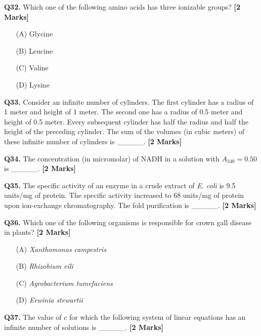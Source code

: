 \documentclass[11pt]{article}
\newcommand{\questionb}[2]{
    \noindent\textbf{Q#2.} #1 \hfill \textbf{[2 Marks]}
}
\begin{document}
\vspace{0.5cm}

\questionb{Which one of the following amino acids has three ionizable groups?}{32}
\begin{enumerate}
    \item[(A)] Glycine
    \item[(B)] Leucine  
    \item[(C)] Valine
    \item[(D)] Lysine
\end{enumerate}

\vspace{0.5cm}

\questionb{Consider an infinite number of cylinders. The first cylinder has a radius of 1 meter and height of 1 meter. The second one has a radius of 0.5 meter and height of 0.5 meter. Every subsequent cylinder has half the radius and half the height of the preceding cylinder. The sum of the volumes (in cubic meters) of these infinite number of cylinders is \_\_\_\_\_.}{33}

\vspace{0.5cm}

\questionb{The concentration (in micromolar) of NADH in a solution with $A_{340} = 0.50$ is \_\_\_\_\_.}{34}

\vspace{0.5cm}

\questionb{The specific activity of an enzyme in a crude extract of \textit{E. coli} is 9.5 units/mg of protein. The specific activity increased to 68 units/mg of protein upon ion-exchange chromatography. The fold purification is \_\_\_\_\_.}{35}

\vspace{0.5cm}

\questionb{Which one of the following organisms is responsible for crown gall disease in plants?}{36}
\begin{enumerate}
    \item[(A)] \textit{Xanthomonas campestris}
    \item[(B)] \textit{Rhizobium eili}  
    \item[(C)] \textit{Agrobacterium tumefaciens}
    \item[(D)] \textit{Erwinia stewartii}
\end{enumerate}

\vspace{0.5cm}

\questionb{The value of $c$ for which the following system of linear equations has an infinite number of solutions is \_\_\_\_\_.}{37}
\end{document}
